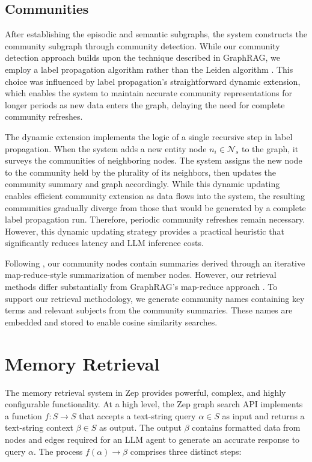 \documentclass{article}
\begin{document}
\subsection{Communities}
After establishing the episodic and semantic subgraphs, the system constructs the community subgraph through community detection. While our community detection approach builds upon the technique described in GraphRAG\cite{graphrag}, we employ a label propagation algorithm \cite{labelprop} rather than the Leiden algorithm \cite{leiden}. This choice was influenced by label propagation's straightforward dynamic extension, which enables the system to maintain accurate community representations for longer periods as new data enters the graph, delaying the need for complete community refreshes.

The dynamic extension implements the logic of a single recursive step in label propagation. When the system adds a new entity node $n_i\in\mathcal{N}_s$ to the graph, it surveys the communities of neighboring nodes. The system assigns the new node to the community held by the plurality of its neighbors, then updates the community summary and graph accordingly. While this dynamic updating enables efficient community extension as data flows into the system, the resulting communities gradually diverge from those that would be generated by a complete label propagation run. Therefore, periodic community refreshes remain necessary. However, this dynamic updating strategy provides a practical heuristic that significantly reduces latency and LLM inference costs.

Following \cite{graphrag}, our community nodes contain summaries derived through an iterative map-reduce-style summarization of member nodes. However, our retrieval methods differ substantially from GraphRAG's map-reduce approach \cite{graphrag}. To support our retrieval methodology, we generate community names containing key terms and relevant subjects from the community summaries. These names are embedded and stored to enable cosine similarity searches.

\section{Memory Retrieval}
The memory retrieval system in Zep provides powerful, complex, and highly configurable functionality. At a high level, the Zep graph search API implements a function $f: S\to S$ that accepts a text-string query $\alpha\in S$ as input and returns a text-string context $\beta\in S$ as output. The output $\beta$ contains formatted data from nodes and edges required for an LLM agent to generate an accurate response to query $\alpha$. The process $f(\alpha)\to\beta$ comprises three distinct steps:
\end{document}
